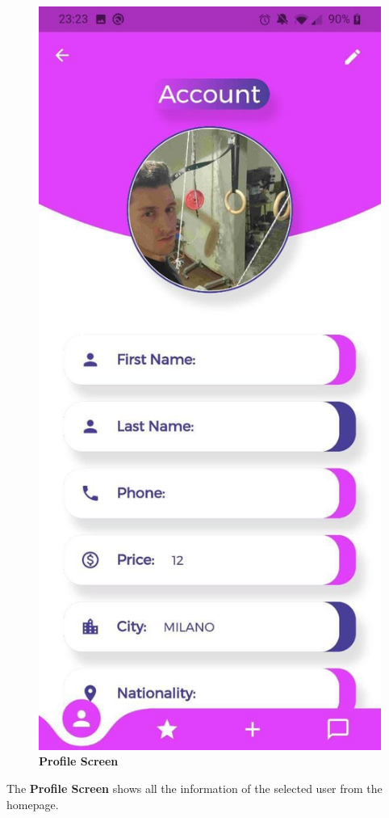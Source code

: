 \documentclass[../../dd.tex]{subfiles}
\begin{document}
    \begin{figure}[H]
        \centering
        \includegraphics[height=.6\textheight]{../../assets/screens/profile.jpg}
        \caption{\textbf{Profile Screen}}\label{fig:figure}
    \end{figure}
    \begin{center}
        The \textbf{Profile Screen} shows all the information of the selected user from the homepage.
    \end{center}
\end{document}
